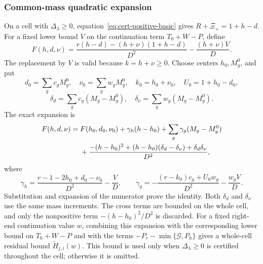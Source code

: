 \documentclass[11pt]{article}
\theoremstyle{definition}
\theoremstyle{remark}
\begin{document}
\subsubsection{Common-mass quadratic expansion}
On a cell with $\Delta_\lambda\ge0$, equation~\eqref{eq:cert-positive-basic}
gives $R+\Xi_+=1+h-d$.
For a fixed lower bound $V$ on the continuation term $T_0+W-P$, define
\[
 F(h,d,\nu)=\frac{r(h-d)-(h+\nu)(1+h-d)}{D^2}-\frac{(h+\nu)V}{D}.
\]
The replacement by $V$ is valid because $k=h+\nu\ge0$.
Choose centers $h_0,M_g^0$, and put
\[
 d_0=\sum_gc_gM_g^0,\quad \nu_0=\sum_gw_gM_g^0,\quad
 k_0=h_0+\nu_0,\quad U_0=1+h_0-d_0,
\]
\[
 \delta_d=\sum_gc_g(M_g-M_g^0),\quad
 \delta_\nu=\sum_gw_g(M_g-M_g^0).
\]
The exact expansion is
\begin{align}\label{eq:cert-quadratic}
 F(h,d,\nu)={}&F(h_0,d_0,\nu_0)+\gamma_h(h-h_0)
                         +\sum_g\gamma_g(M_g-M_g^0)\\
 &+\frac{-(h-h_0)^2+(h-h_0)(\delta_d-\delta_\nu)
                       +\delta_d\delta_\nu}{D^2},\notag
\end{align}
where
\begin{equation}\label{eq:cert-quadratic-coefficients}
 \gamma_h=\frac{r-1-2h_0+d_0-\nu_0}{D^2}-\frac VD,\qquad
 \gamma_g=-\frac{(r-k_0)c_g+U_0w_g}{D^2}-\frac{w_gV}{D}.
\end{equation}
Substitution and expansion of the numerator prove the identity.
Both $\delta_d$ and $\delta_\nu$ use the same mass increments.
The cross terms are bounded on the whole cell, and only the nonpositive
term $-(h-h_0)^2/D^2$ is discarded.
For a fixed right-end continuation value $w$, combining this expansion
with the corresponding lower bound on $T_0+W-P$ and with the terms
$-P_r-\min\{\mathcal G,P_h\}$ gives a whole-cell residual bound
$\widetilde H_{j,i}(w)$.
This bound is used only when $\Delta_\lambda\ge0$ is certified throughout
the cell; otherwise it is omitted.
\end{document}
